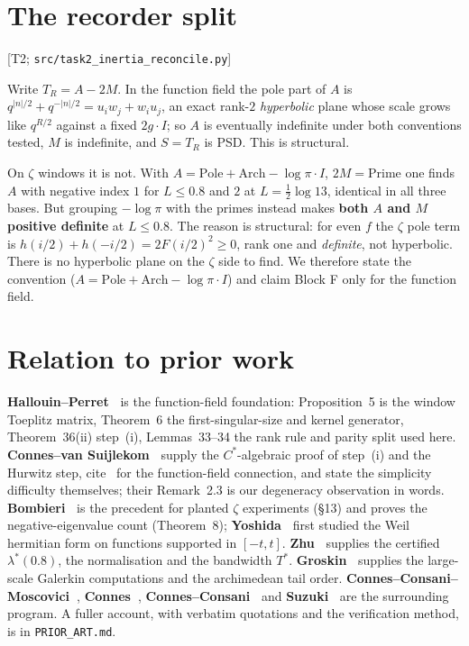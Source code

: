 \documentclass[11pt,a4paper]{article}
\theoremstyle{definition}
\theoremstyle{remark}
\newcommand{\tier}[1]{{\small\textsf{[#1]}}}
\newcommand{\T}{T_R}
\newcommand{\lstar}{\lambda^{*}}
\newcommand{\src}[1]{{\footnotesize\texttt{#1}}}
\begin{document}
\section{The recorder split}\label{sec:recorder}
\tier{T2; \src{src/task2\_inertia\_reconcile.py}}

Write $\T=A-2M$. In the function field the pole part of $A$ is
$q^{|n|/2}+q^{-|n|/2}=u_iw_j+w_iu_j$, an exact rank-$2$ \emph{hyperbolic} plane whose scale
grows like $q^{R/2}$ against a fixed $2g\cdot I$; so $A$ is eventually indefinite under both
conventions tested, $M$ is indefinite, and $S=\T$ is PSD. This is structural.

On $\zeta$ windows it is not. With
$A=\mathrm{Pole}+\mathrm{Arch}-\log\pi\cdot I$, $2M=\mathrm{Prime}$ one finds $A$ with
negative index $1$ for $L\le0.8$ and $2$ at $L=\tfrac12\log13$, identical in all three
bases. But grouping $-\log\pi$ with the primes instead makes \textbf{both $A$ and $M$
positive definite} at $L\le0.8$. The reason is structural: for even $f$ the $\zeta$ pole
term is $h(i/2)+h(-i/2)=2F(i/2)^{2}\ge0$, rank one and \emph{definite}, not hyperbolic.
There is no hyperbolic plane on the $\zeta$ side to find. We therefore state the convention
($A=\mathrm{Pole}+\mathrm{Arch}-\log\pi\cdot I$) and claim Block F only for the function
field.

\section{Relation to prior work}\label{sec:prior}

\textbf{Hallouin--Perret~\cite{HP19}} is the function-field foundation: Proposition~5 is the
window Toeplitz matrix, Theorem~6 the first-singular-size and kernel generator,
Theorem~36(ii) step~(i), Lemmas~33--34 the rank rule and parity split used here.
\textbf{Connes--van Suijlekom~\cite{CvS}} supply the $C^{*}$-algebraic proof of step~(i) and
the Hurwitz step, cite~\cite{HP19} for the function-field connection, and state the
simplicity difficulty themselves; their Remark~2.3 is our degeneracy observation in words.
\textbf{Bombieri~\cite{Bombieri}} is the precedent for planted $\zeta$ experiments
(\S13) and proves the negative-eigenvalue count (Theorem~8); \textbf{Yoshida~\cite{Yoshida}}
first studied the Weil hermitian form on functions supported in $[-t,t]$.
\textbf{Zhu~\cite{Zhu}} supplies the certified $\lstar(0.8)$, the normalisation and the
bandwidth $T^{*}$. \textbf{Groskin~\cite{Groskin1,Groskin2}} supplies the large-scale
Galerkin computations and the archimedean tail order.
\textbf{Connes--Consani--Moscovici~\cite{CCM}}, \textbf{Connes~\cite{ConnesLetter}},
\textbf{Connes--Consani~\cite{CC21}} and \textbf{Suzuki~\cite{Suzuki}} are the surrounding
program. A fuller account, with verbatim quotations and the verification method, is in
\texttt{PRIOR\_ART.md}.
\end{document}
